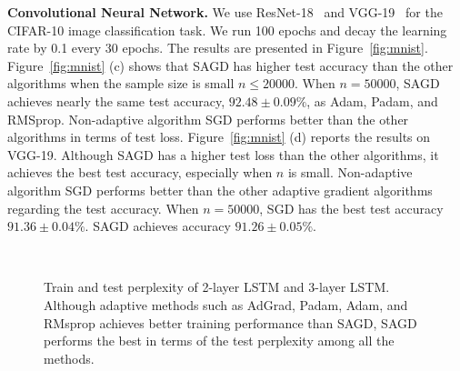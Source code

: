 \documentclass[11pt]{article}
\begin{document}
\textbf{Convolutional Neural Network.}
We use ResNet-18~\citep{hezh2016} and VGG-19~\citep{sizi2014} for the CIFAR-10 image classification task. We run 100 epochs and decay the learning rate by 0.1 every 30 epochs. 
The results are presented in Figure~\ref{fig:mnist}. 
Figure~\ref{fig:mnist} (c) shows that \textsc{SAGD} has higher test accuracy than the 
other algorithms when the sample size is small \ie $n \leq 20000$.
When $n = 50000$, \textsc{SAGD} achieves nearly the same test accuracy, $92.48 \pm 0.09\%$,  as Adam, Padam, and RMSprop.
Non-adaptive algorithm 
SGD performs better than the other algorithms in terms of test loss. 
Figure~\ref{fig:mnist} (d) reports the results on VGG-19. Although \textsc{SAGD} has a higher test loss than the other algorithms, it achieves the best test accuracy, especially when $n$ is small. Non-adaptive algorithm SGD performs better than the other adaptive gradient algorithms regarding the test accuracy.
When $n= 50000$, SGD has the best test accuracy $91.36 \pm 0.04\%$. \textsc{SAGD} achieves accuracy $91.26 \pm 0.05\%$.

\begin{figure}[t] 
 \mbox{
}
 \caption[]{Train and test perplexity of 2-layer LSTM and 3-layer LSTM. 
 Although adaptive methods such as AdGrad, Padam, Adam, and RMsprop achieves better training performance than \textsc{SAGD}, \textsc{SAGD} performs the best in terms of the test perplexity among all the methods.
} 
 \label{fig:cifar10}
\end{figure}
\end{document}
